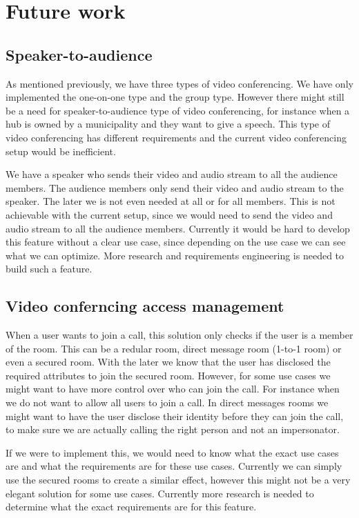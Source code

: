 \documentclass{report}
\begin{document}


\chapter{Future work}
\section{Speaker-to-audience}
As mentioned previously, we have three types of video conferencing. We have only implemented the one-on-one type and
the group type. However there might still be a need for speaker-to-audience type of video conferencing, for instance
when a hub is owned by a municipality and they want to give a speech. This type of video conferencing has different
requirements and the current video conferencing setup would be inefficient.

We have a speaker who sends their video and audio stream to all the audience members. The audience members only send
their video and audio stream to the speaker. The later we is not even needed at all or for all members. This is not
achievable with the current setup, since we would need to send the video and audio stream to all the audience members.
Currently it would be hard to develop this feature without a clear use case, since depending on the use case we can
see what we can optimize. More research and requirements engineering is needed to build such a feature.

\section{Video conferncing access management}
When a user wants to join a call, this solution only checks if the user is a member of the room. This can be a
redular room, direct message room (1-to-1 room) or even a secured room. With the later we know that the user has
disclosed the required attributes to join the secured room. However, for some use cases we might want to have more
control over who can join the call. For instance when we do not want to allow all users to join a call. In direct
messages rooms we might want to have the user disclose their identity before they can join the call, to
make sure we are actually calling the right person and not an impersonator.

If we were to implement this, we would need to know what the exact use cases are and what the requirements are for
these use cases. Currently we can simply use the secured rooms to create a similar effect, however this might not be
a very elegant solution for some use cases. Currently more research is needed to determine what the exact requirements
are for this feature.
\end{document}
